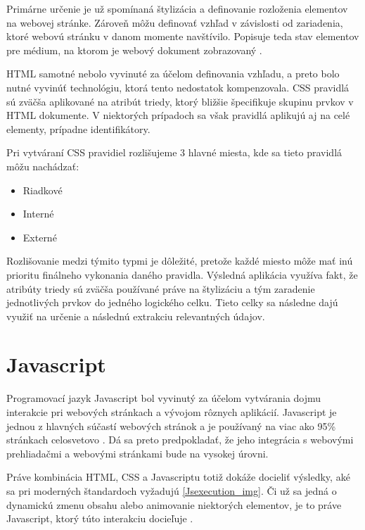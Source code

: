 Primárne určenie je už spomínaná štylizácia a definovanie rozloženia elementov na webovej stránke. Zároveň môžu definovať vzhľad v závislosti od zariadenia, ktoré webovú stránku v danom momente navštívilo. Popisuje teda stav elementov pre médium, na ktorom je webový dokument zobrazovaný \cite{CSS}. 

HTML samotné nebolo vyvinuté za účelom definovania vzhľadu, a preto bolo nutné vyvinúť technológiu, ktorá tento nedostatok kompenzovala. CSS pravidlá sú zväčša aplikované na atribút triedy, ktorý bližšie špecifikuje skupinu prvkov v HTML dokumente. V niektorých prípadoch sa však pravidlá aplikujú aj na celé elementy, prípadne identifikátory.

Pri vytváraní CSS pravidiel rozlišujeme 3 hlavné miesta, kde sa tieto pravidlá môžu nachádzať:

\begin{itemize}
    \item {Riadkové}
    \item {Interné}
    \item {Externé}
\end{itemize}

Rozlišovanie medzi týmito typmi je dôležité, pretože každé miesto môže mať inú prioritu finálneho vykonania daného pravidla. Výsledná aplikácia využíva fakt, že atribúty triedy sú zväčša používané práve na štylizáciu a tým zaradenie jednotlivých prvkov do jedného logického celku. Tieto celky sa následne dajú využiť na určenie a následnú extrakciu relevantných údajov.

\section{Javascript}

Programovací jazyk Javascript bol vyvinutý za účelom vytvárania dojmu interakcie pri webových stránkach a vývojom rôznych aplikácií. Javascript je jednou z hlavných súčastí webových stránok a je používaný na viac ako 95\% stránkach celosvetovo \cite{HowPopular}. Dá sa preto predpokladať, že jeho integrácia s webovými prehliadačmi a webovými stránkami bude na vysokej úrovni. 

\bigskip

Práve kombinácia HTML, CSS a Javascriptu totiž dokáže docieliť výsledky, aké sa pri moderných štandardoch vyžadujú \ref{Jsexecution_img}. Či už sa jedná o dynamickú zmenu obsahu alebo animovanie niektorých elementov, je to práve Javascript, ktorý túto interakciu docieľuje \cite{Javascript}. 

